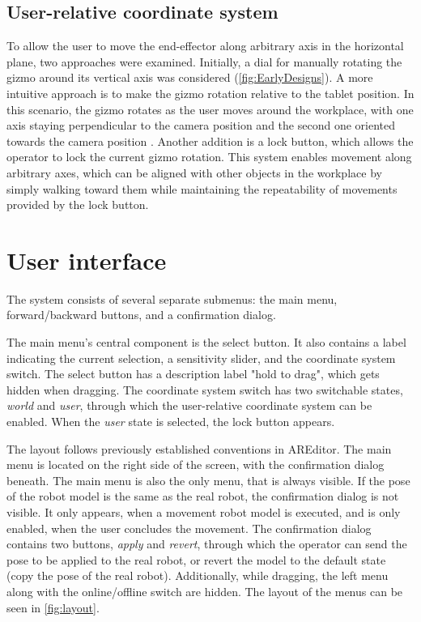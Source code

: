 \subsection{User-relative coordinate system}

To allow the user to move the end-effector along arbitrary axis in the horizontal plane, two approaches were examined. Initially, a dial for manually rotating the gizmo around its vertical axis was considered (\ref{fig:EarlyDesigns}). A more intuitive approach is to make the gizmo rotation relative to the tablet position. In this scenario, the gizmo rotates as the user moves around the workplace, with one axis staying perpendicular to the camera position and the second one oriented towards the camera position . Another addition is a lock button, which allows the operator to lock the current gizmo rotation. This system enables movement along arbitrary axes, which can be aligned with other objects in the workplace by simply walking toward them while maintaining the repeatability of movements provided by the lock button. 

\section{User interface}
The system consists of several separate submenus: the main menu, forward/backward buttons, and a confirmation dialog.

The main menu's central component is the select button. It also contains a label indicating the current selection, a sensitivity slider, and the coordinate system switch. The select button has a description label "hold to drag", which gets hidden when dragging. The coordinate system switch has two switchable states, \textit{world} and \textit{user}, through which the user-relative coordinate system can be enabled. When the \textit{user} state is selected, the lock button appears. 

The layout follows previously established conventions in AREditor. The main menu is located on the right side of the screen, with the confirmation dialog beneath. The main menu is also the only menu, that is always visible. If the pose of the robot model is the same as the real robot, the confirmation dialog is not visible. It only appears, when a movement robot model is executed, and is only enabled, when the user concludes the movement. The confirmation dialog contains two buttons, \textit{apply} and \textit{revert}, through which the operator can send the pose to be applied to the real robot, or revert the model to the default state (copy the pose of the real robot). Additionally, while dragging, the left menu along with the online/offline switch are hidden. The layout of the menus can be seen in \ref{fig:layout}.

